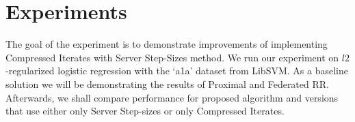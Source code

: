 \documentclass{article}
\begin{document}
\section{Experiments}
The goal of the experiment is to demonstrate improvements of implementing Compressed Iterates with Server Step-Sizes method. We
run our experiment on $l2$-regularized logistic regression
with the ‘a1a’ dataset from LibSVM.
As a baseline solution we will be demonstrating the results of Proximal and Federated RR. Afterwards, we shall compare performance for proposed algorithm and versions that use either only Server Step-sizes or only Compressed Iterates.
\begin{figure}[h]
\begin{minipage}[h]{0.49\linewidth}
\end{minipage}
\hfill
\begin{minipage}[h]{0.49\linewidth}
\end{minipage}
\end{figure}
\end{document}
